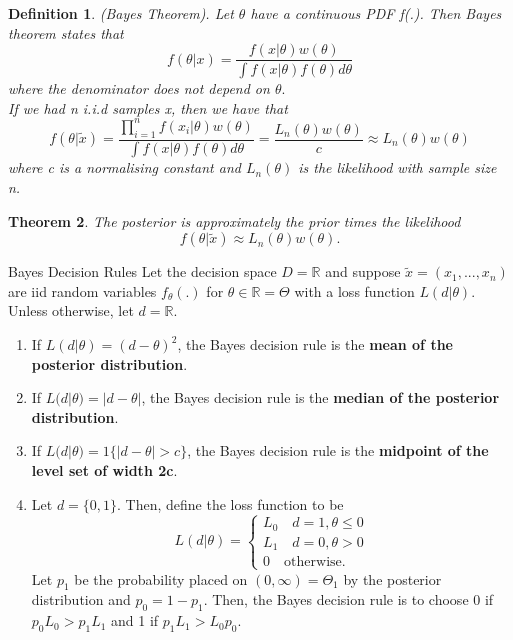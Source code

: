\documentclass[twoside]{article}
\newcounter{lecnum}
\newtheorem{theorem}{Theorem}[lecnum]
\newtheorem{definition}[theorem]{Definition}
\begin{document}
\begin{definition}(Bayes Theorem). Let $\theta$ have a continuous PDF f(.). Then Bayes theorem states that 
$$
f(\theta|x) = \frac{f(x|\theta)w(\theta)}{\int f(x|\theta)f(\theta)d\theta}
$$
where the denominator does not depend on $\theta.$\\ If we had n i.i.d samples x, then we have that 
$$
f(\theta|\tilde{x}) = \frac{\prod_{i=1}^{n}f(x_i|\theta)w(\theta)}{\int f(x|\theta)f(\theta)d\theta} = \frac{L_n(\theta)w(\theta)}{c} \approx L_n(\theta)w(\theta)
$$
where c is a normalising constant and $L_n(\theta)$ is the likelihood with sample size n. 
\end{definition}

\begin{theorem}The posterior is approximately the prior times the likelihood 
$$
f(\theta|\tilde{x}) \approx L_n(\theta)w(\theta).
$$
\end{theorem}



\begin{theorem_exam}{Bayes Decision Rules}{} Let the decision space $D = \mathbb{R}$ and suppose $\tilde{x} = (x_1,...,x_n)$ are iid random variables $f_{\theta}(.)$ for $\theta \in \mathbb{R} = \Theta$ with a loss function $L(d|\theta).$ Unless otherwise, let $d = \mathbb{R}.$
\begin{enumerate}
\item If $L(d|\theta) = (d-\theta)^2$, the Bayes decision rule is the \textbf{mean of the posterior distribution}.
\item If $L(d|\theta) = |d-\theta|$, the Bayes decision rule is the \textbf{median of the posterior distribution}.
\item If $L(d|\theta) = 1\{|d-\theta| > c\}$, the Bayes decision rule is the \textbf{midpoint of the level set of width 2c}.
\item Let $d = \{0,1\}$. Then, define the loss function to be 
$$
L(d|\theta) = 
\begin{cases}
L_0 \quad d=1,\theta \leq 0\\
L_1 \quad d=0,\theta > 0\\
0 \quad \text{otherwise.}
\end{cases}
$$
Let $p_1$ be the probability placed on $(0,\infty) = \Theta_1$ by the posterior distribution and $p_0 = 1 - p_1.$ Then, the Bayes decision rule is to choose 0 if $p_0L_0 > p_1L_1$ and 1 if $p_1L_1 > L_0p_0.$
\end{enumerate}
\end{theorem_exam}
\end{document}
